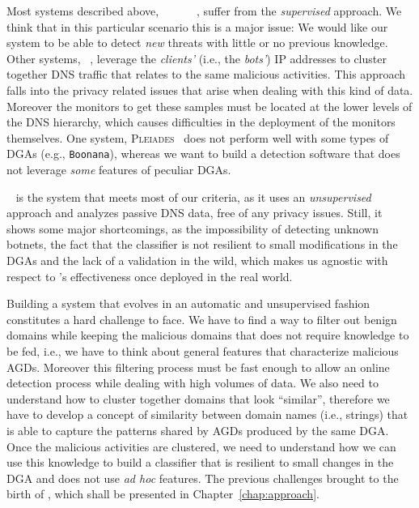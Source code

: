 Most systems described above, ~\cite{haddadi2013}~\cite{sharifnya2013}~\cite{antonakakis2011}~\cite{antonakakis2012}~\cite{perdisci2012}~\cite{bilge2012},
suffer from the \emph{supervised} approach. We think
that in this particular scenario this is a major issue: We would like our system to
be able to detect \emph{new} threats with little or no previous knowledge.
Other systems, \cite{antonakakis2012}~\cite{sharifnya2013}, leverage the \emph{clients'} (i.e., the \emph{bots'})
IP addresses to cluster together DNS traffic that relates to the same malicious
activities. This approach falls into the privacy related issues that arise when
dealing with this kind of data. Moreover the monitors to get these samples must be
located at the lower levels of the DNS hierarchy, which causes difficulties in
the deployment of the monitors themselves.
One system, \textsc{Pleiades}~\cite{antonakakis2012} does not perform well with some
types of DGAs (e.g., \texttt{Boonana}),
whereas we want to build a detection software that does not leverage \emph{some}
features of peculiar DGAs.

\phoenix~\cite{schiavoni2013} is the system that meets most of our criteria, as
it uses an \emph{unsupervised} approach and analyzes passive DNS data, free of
any privacy issues.
Still, it shows some major shortcomings, as the impossibility of detecting
unknown botnets, the fact that the classifier is not resilient to
small modifications in the DGAs and the lack of a validation in the wild, which
makes us agnostic with respect to \phoenix's effectiveness once deployed in the real
world.

Building a system that evolves in an automatic and unsupervised fashion constitutes a hard challenge to face.
We have to find a way to filter out benign domains while keeping the malicious
domains that does not require knowledge to be fed, i.e., we have to think about
general features that characterize malicious AGDs. Moreover this filtering
process must be fast enough to allow an online detection process while dealing
with high volumes of data.
We also need to understand how to cluster together domains that look ``similar'',
therefore we have to develop a concept of similarity between domain names
(i.e., strings) that is able to capture the patterns shared by AGDs produced
by the same DGA. Once the malicious activities are clustered, we need to
understand how we can use this knowledge to build a classifier that is
resilient to small changes in the DGA and does not use \emph{ad hoc} features.
The previous challenges brought to the birth of \thesystem, which shall be
presented in Chapter~\ref{chap:approach}.
